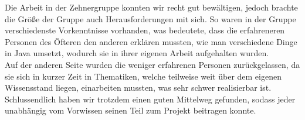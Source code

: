 Die Arbeit in der Zehnergruppe konnten wir recht gut bewältigen, jedoch brachte die Größe der Gruppe auch Herausforderungen mit sich. 
So waren in der Gruppe verschiedenste Vorkenntnisse vorhanden, was bedeutete, dass die erfahreneren Personen des Öfteren den anderen erklären mussten, 
wie man verschiedene Dinge in Java umsetzt, wodurch sie in ihrer eigenen Arbeit aufgehalten wurden. \\
Auf der anderen Seite wurden die weniger erfahrenen Personen \glqq zurückgelassen\grqq, da sie sich in kurzer Zeit in Thematiken, welche teilweise weit über dem eigenen Wissensstand liegen, einarbeiten mussten, was sehr schwer realisierbar ist.
Schlussendlich haben wir trotzdem einen guten Mittelweg gefunden, sodass jeder unabhängig vom Vorwissen seinen Teil zum Projekt beitragen konnte.
